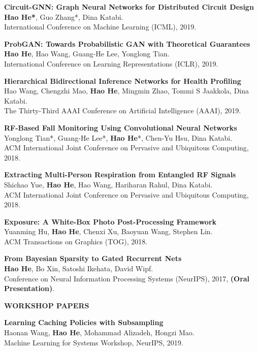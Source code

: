 \documentclass[margin]{res}
\begin{document}
\begin{resume}
\textbf{Circuit-GNN: Graph Neural Networks for Distributed Circuit Design}\\
\textbf{Hao He*}, Guo Zhang*, Dina Katabi.\\
International Conference on Machine Learning (ICML), 2019.

\textbf{ProbGAN: Towards Probabilistic GAN with Theoretical Guarantees}\\
\textbf{Hao He}, Hao Wang, Guang-He Lee, Yonglong Tian.\\
International Conference on Learning Representations (ICLR), 2019.

\textbf{Hierarchical Bidirectional Inference Networks for Health Profiling}\\
Hao Wang, Chengzhi Mao, \textbf{Hao He}, Mingmin Zhao, Tommi S Jaakkola, Dina Katabi.\\
The Thirty-Third AAAI Conference on Artificial Intelligence (AAAI), 2019.

\textbf{RF-Based Fall Monitoring Using Convolutional Neural Networks}\\
Yonglong Tian*, Guang-He Lee*, \textbf{Hao He}*, Chen-Yu Hsu, Dina Katabi.\\
ACM International Joint Conference on Pervasive and Ubiquitous Computing, 2018.

\textbf{Extracting Multi-Person Respiration from Entangled RF Signals}\\
Shichao Yue, \textbf{Hao He}, Hao Wang, Hariharan Rahul, Dina Katabi.\\
ACM International Joint Conference on Pervasive and Ubiquitous Computing, 2018.

\textbf{Exposure: A White-Box Photo Post-Processing Framework}\\
Yuanming Hu, \textbf{Hao He}, Chenxi Xu, Baoyuan Wang, Stephen Lin.\\
ACM Transactions on Graphics (TOG), 2018.

\textbf{From Bayesian Sparsity to Gated Recurrent Nets}\\
\textbf{Hao He}, Bo Xin, Satoshi Ikehata, David Wipf.\\
Conference on Neural Information Processing Systems (NeurIPS), 2017, \textbf{(Oral Presentation)}.

\textbf{WORKSHOP PAPERS}

\textbf{Learning Caching Policies with Subsampling}\\
Haonan Wang, \textbf{Hao He}, Mohammad Alizadeh, Hongzi Mao.\\
Machine Learning for Systems Workshop, NeurIPS, 2019.


\end{resume}
\end{document}
